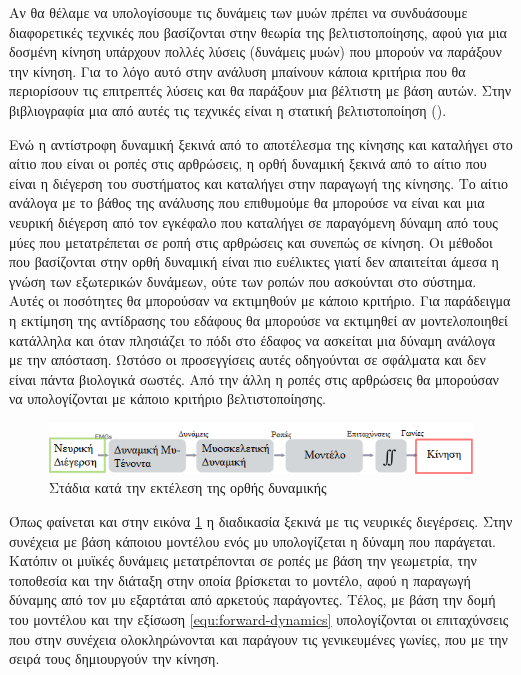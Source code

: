 Αν θα θέλαμε να υπολογίσουμε τις δυνάμεις των μυών πρέπει να συνδυάσουμε διαφορετικές τεχνικές που βασίζονται στην θεωρία της βελτιστοποίησης, αφού για μια δοσμένη κίνηση υπάρχουν πολλές λύσεις (δυνάμεις μυών) που μπορούν να παράξουν την κίνηση. Για το λόγο αυτό στην ανάλυση μπαίνουν κάποια κριτήρια που θα περιορίσουν τις επιτρεπτές λύσεις και θα παράξουν μια βέλτιστη με βάση αυτών. Στην βιβλιογραφία μια από αυτές τις τεχνικές είναι η στατική βελτιστοποίηση ().

Ενώ η αντίστροφη δυναμική ξεκινά από το αποτέλεσμα της κίνησης και καταλήγει στο αίτιο που είναι οι ροπές στις αρθρώσεις, η ορθή δυναμική ξεκινά από το αίτιο που είναι η διέγερση του συστήματος και καταλήγει στην παραγωγή της κίνησης. Το αίτιο ανάλογα με το βάθος της ανάλυσης που επιθυμούμε θα μπορούσε να είναι και μια νευρική διέγερση από τον εγκέφαλο που καταλήγει σε παραγόμενη δύναμη από τους μύες που μετατρέπεται σε ροπή στις αρθρώσεις και συνεπώς σε κίνηση. Οι μέθοδοι που βασίζονται στην ορθή δυναμική είναι πιο ευέλικτες γιατί δεν απαιτείται άμεσα η γνώση των εξωτερικών δυνάμεων, ούτε των ροπών που ασκούνται στο σύστημα. Αυτές οι ποσότητες θα μπορούσαν να εκτιμηθούν με κάποιο κριτήριο. Για παράδειγμα η εκτίμηση της αντίδρασης του εδάφους θα μπορούσε να εκτιμηθεί αν μοντελοποιηθεί κατάλληλα και όταν πλησιάζει το πόδι στο έδαφος να ασκείται μια δύναμη ανάλογα με την απόσταση. Ωστόσο οι προσεγγίσεις αυτές οδηγούνται σε σφάλματα και δεν είναι πάντα βιολογικά σωστές. Από την άλλη η ροπές στις αρθρώσεις θα μπορούσαν να υπολογίζονται με κάποιο κριτήριο βελτιστοποίησης.

\begin{figure}[H]
    \centering
    \includegraphics[width=1.0\textwidth, keepaspectratio]{fig/forward-simulation.png}
    \caption{Στάδια κατά την εκτέλεση της ορθής δυναμικής\protect\footnotemark}
    \label{fig:forward-simulation}
\end{figure}

Όπως φαίνεται και στην εικόνα \ref{fig:forward-simulation} η διαδικασία ξεκινά με τις νευρικές διεγέρσεις. Στην συνέχεια με βάση κάποιου μοντέλου ενός μυ υπολογίζεται η δύναμη που παράγεται. Κατόπιν οι μυϊκές δυνάμεις μετατρέπονται σε ροπές με βάση την γεωμετρία, την τοποθεσία και την διάταξη στην οποία βρίσκεται το μοντέλο, αφού η παραγωγή δύναμης από τον μυ εξαρτάται από αρκετούς παράγοντες. Τέλος, με βάση την δομή του μοντέλου και την εξίσωση \ref{equ:forward-dynamics} υπολογίζονται οι επιταχύνσεις που στην συνέχεια ολοκληρώνονται και παράγουν τις γενικευμένες γωνίες, που με την σειρά τους δημιουργούν την κίνηση.

